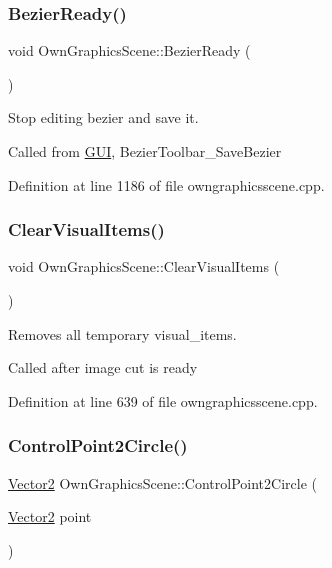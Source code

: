 \subsubsection{\texorpdfstring{Bezier\+Ready()}{BezierReady()}}
{\footnotesize\ttfamily void Own\+Graphics\+Scene\+::\+Bezier\+Ready (\begin{DoxyParamCaption}{ }\end{DoxyParamCaption})}



Stop editing bezier and save it. 

Called from \mbox{\hyperlink{classGUI}{G\+UI}}, Bezier\+Toolbar\+\_\+\+Save\+Bezier 

Definition at line 1186 of file owngraphicsscene.\+cpp.

\mbox{\label{classOwnGraphicsScene_a158c6430ca8e07642b693e37ec05119e}} 
\subsubsection{\texorpdfstring{Clear\+Visual\+Items()}{ClearVisualItems()}}
{\footnotesize\ttfamily void Own\+Graphics\+Scene\+::\+Clear\+Visual\+Items (\begin{DoxyParamCaption}{ }\end{DoxyParamCaption})}



Removes all temporary visual\+\_\+items. 

Called after image cut is ready 

Definition at line 639 of file owngraphicsscene.\+cpp.

\mbox{\label{classOwnGraphicsScene_abc2de254d3e34b716eb36e33e0486f33}} 
\subsubsection{\texorpdfstring{Control\+Point2\+Circle()}{ControlPoint2Circle()}}
{\footnotesize\ttfamily \mbox{\hyperlink{classVector2}{Vector2}} Own\+Graphics\+Scene\+::\+Control\+Point2\+Circle (\begin{DoxyParamCaption}\item[{\mbox{\hyperlink{classVector2}{Vector2}}}]{point }\end{DoxyParamCaption})}



